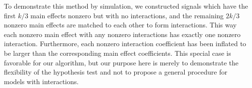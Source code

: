 \documentclass{imsart}
\newcommand{\argmax}{\mathop{\mathrm{argmax}}}
\newcommand{\norm}[1]{\lVert #1 \rVert}
\begin{document}

To demonstrate this method by simulation, we constructed signals which have
the first $k/3$ main effects nonzero but with no interactions, and the
remaining $2k/3$ nonzero main effects are matched to each other to form
interactions.
This way each nonzero main effect with any nonzero interactions has
exactly one nonzero interaction. Furthermore, each nonzero interaction
coefficient has been inflated to be larger than the corresponding main
effect coefficients. This special case is favorable for our algorithm,
but our purpose here is merely to demonstrate the flexibility of the
hypothesis test and not to propose a general procedure for models with
interactions.
\end{document}
